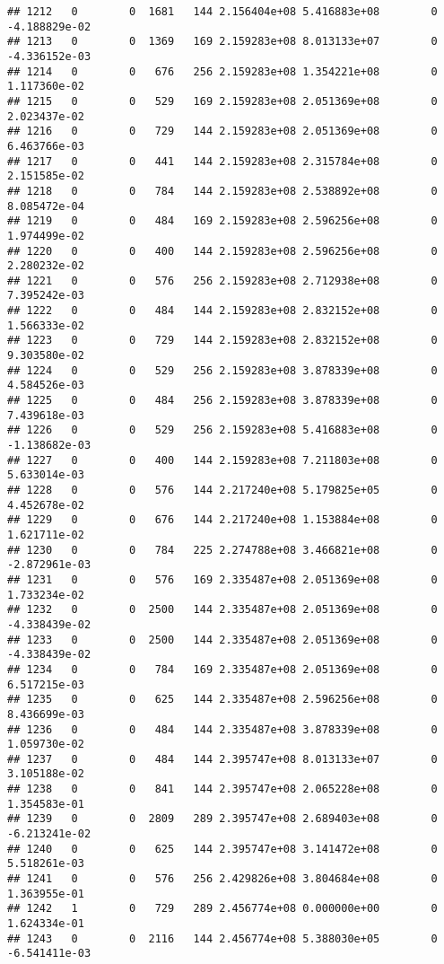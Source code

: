 \documentclass[
]{article}
\begin{document}
\begin{enumerate}
\begin{verbatim}
## 1212   0        0  1681   144 2.156404e+08 5.416883e+08        0 -4.188829e-02
## 1213   0        0  1369   169 2.159283e+08 8.013133e+07        0 -4.336152e-03
## 1214   0        0   676   256 2.159283e+08 1.354221e+08        0  1.117360e-02
## 1215   0        0   529   169 2.159283e+08 2.051369e+08        0  2.023437e-02
## 1216   0        0   729   144 2.159283e+08 2.051369e+08        0  6.463766e-03
## 1217   0        0   441   144 2.159283e+08 2.315784e+08        0  2.151585e-02
## 1218   0        0   784   144 2.159283e+08 2.538892e+08        0  8.085472e-04
## 1219   0        0   484   169 2.159283e+08 2.596256e+08        0  1.974499e-02
## 1220   0        0   400   144 2.159283e+08 2.596256e+08        0  2.280232e-02
## 1221   0        0   576   256 2.159283e+08 2.712938e+08        0  7.395242e-03
## 1222   0        0   484   144 2.159283e+08 2.832152e+08        0  1.566333e-02
## 1223   0        0   729   144 2.159283e+08 2.832152e+08        0  9.303580e-02
## 1224   0        0   529   256 2.159283e+08 3.878339e+08        0  4.584526e-03
## 1225   0        0   484   256 2.159283e+08 3.878339e+08        0  7.439618e-03
## 1226   0        0   529   256 2.159283e+08 5.416883e+08        0 -1.138682e-03
## 1227   0        0   400   144 2.159283e+08 7.211803e+08        0  5.633014e-03
## 1228   0        0   576   144 2.217240e+08 5.179825e+05        0  4.452678e-02
## 1229   0        0   676   144 2.217240e+08 1.153884e+08        0  1.621711e-02
## 1230   0        0   784   225 2.274788e+08 3.466821e+08        0 -2.872961e-03
## 1231   0        0   576   169 2.335487e+08 2.051369e+08        0  1.733234e-02
## 1232   0        0  2500   144 2.335487e+08 2.051369e+08        0 -4.338439e-02
## 1233   0        0  2500   144 2.335487e+08 2.051369e+08        0 -4.338439e-02
## 1234   0        0   784   169 2.335487e+08 2.051369e+08        0  6.517215e-03
## 1235   0        0   625   144 2.335487e+08 2.596256e+08        0  8.436699e-03
## 1236   0        0   484   144 2.335487e+08 3.878339e+08        0  1.059730e-02
## 1237   0        0   484   144 2.395747e+08 8.013133e+07        0  3.105188e-02
## 1238   0        0   841   144 2.395747e+08 2.065228e+08        0  1.354583e-01
## 1239   0        0  2809   289 2.395747e+08 2.689403e+08        0 -6.213241e-02
## 1240   0        0   625   144 2.395747e+08 3.141472e+08        0  5.518261e-03
## 1241   0        0   576   256 2.429826e+08 3.804684e+08        0  1.363955e-01
## 1242   1        0   729   289 2.456774e+08 0.000000e+00        0  1.624334e-01
## 1243   0        0  2116   144 2.456774e+08 5.388030e+05        0 -6.541411e-03

\end{verbatim}
\end{enumerate}
\end{document}
